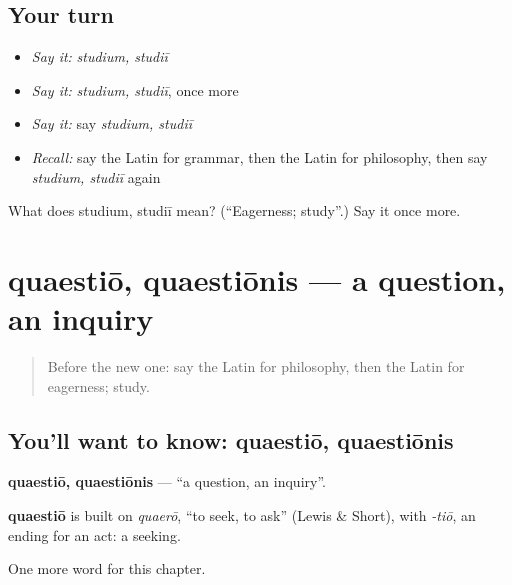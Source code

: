 \subsection*{Your turn}
\begin{itemize}
\raggedright
  \item \emph{Say it:} \emph{studium, studiī}
  \item \emph{Say it:} \emph{studium, studiī}, once more
  \item \emph{Say it:} say \emph{studium, studiī}
  \item \emph{Recall:} say the Latin for grammar, then the Latin for philosophy, then say \emph{studium, studiī} again
\end{itemize}

\begin{tcolorbox}[breakable,colback=teal!4,colframe=teal!35!black,title={Before you move on}]
What does studium, studiī mean? (\textquotedblleft{}Eagerness; study\textquotedblright{}.) Say it once more.
\end{tcolorbox}
\section[quaestiō, quaestiōnis]{quaestiō, quaestiōnis — a question, an inquiry}

\label{lesson:LA-C226-quaestio}



\begin{quote}
Before the new one: say the Latin for philosophy, then the Latin for eagerness; study.
\end{quote}

\subsection*{You'll want to know: quaestiō, quaestiōnis}
\textbf{quaestiō, quaestiōnis} — \textquotedblleft{}a question, an inquiry\textquotedblright{}.

\begin{cousinweb}
\textbf{quaestiō} is built on \emph{quaerō}, \textquotedblleft{}to seek, to ask\textquotedblright{} (Lewis \& Short), with \emph{-tiō}, an ending for an act: a seeking.
\end{cousinweb}

\begin{grammarlens}[title={What you've built}]
One more word for this chapter.
\end{grammarlens}

